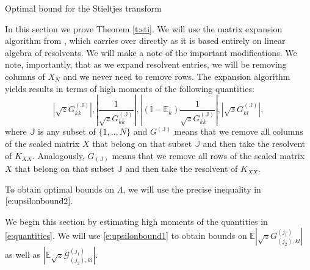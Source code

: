 \documentclass[11pt, a4paper, oneside]{book}
\numberwithin{equation}{chapter}
\newcommand{\E}{\mathbb E}
\newcommand{\J}{\mathbb J}
\begin{document}
%
\begin{section}{Optimal bound for the Stieltjes transform} \label{Expand}

In this section we prove Theorem \ref{t:sti}. We will use the matrix expansion algorithm from \cite{cacciapuoti2015bounds}, which carries over directly as it is based entirely on linear algebra of resolvents. We will make a note of the important modifications. We note, importantly, that as we expand resolvent entries, we will be removing columns of $X_N$ and we never need to remove rows. The expansion algorithm yields results in terms of high moments of the following quantities:
%
\begin{equation}\label{e:quantities} | \sqrt{z} G_{kk}^{(\J)} | , \left | \frac{1}{\sqrt{z}G_{kk}^{(\J)}} \right | ,\left| (\mathbb{I}-\E_k) \frac{1}{\sqrt{z} G_{kk}^{(\J)}} \right |, |\sqrt{z} G_{kl}^{(\J)}|,  
\end{equation}
%
where $\J$ is any subset of $\{1,..,N\}$ and $G^{(\J)}$ means that we remove all columns of the scaled matrix $X$ that belong on that subset $\J$ and then take the resolvent of $K_{XX}$. Analogously, $G_{(\J)}$ means that we remove all rows of the scaled matrix $X$ that belong on that subset $\J$ and then take the resolvent of $K_{XX}$.

To obtain optimal bounds on $\Lambda$, we will use the precise inequality in $\eqref{e:upsilonbound2}.$

We begin this section by estimating high moments of the quantities in \eqref{e:quantities}. We will use \eqref{e:upsilonbound1} to obtain bounds on $\E |\sqrt{z} G_{(j_2), kl}^{(j_1)}|$ as well as $|\E\sqrt{z} \mathcal{G}_{(j_2), kl}^{(j_1)}|$.


\end{section}
\end{document}
